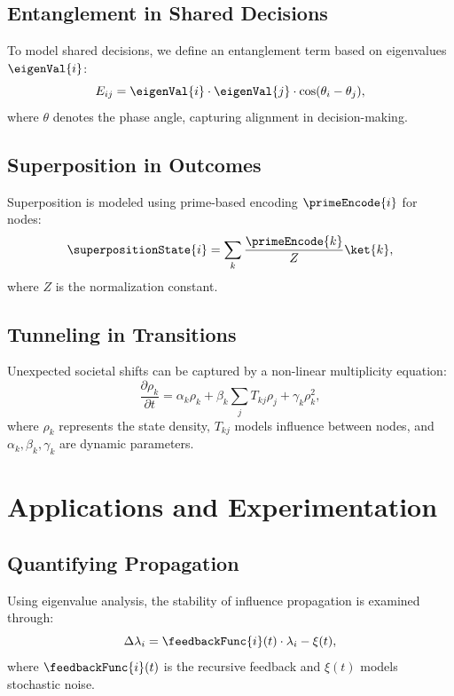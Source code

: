 \documentclass{article}
\theoremstyle{plain}
\begin{document}
\subsection{Entanglement in Shared Decisions}
To model shared decisions, we define an entanglement term based on eigenvalues \( \eigenVal{i} \):
\begin{equation}
    E_{ij} = \eigenVal{i} \cdot \eigenVal{j} \cdot \cos(\theta_i - \theta_j),
\end{equation}
where \( \theta \) denotes the phase angle, capturing alignment in decision-making.

\subsection{Superposition in Outcomes}
Superposition is modeled using prime-based encoding \( \primeEncode{i} \) for nodes:
\begin{equation}
    \superpositionState{i} = \sum_{k} \frac{\primeEncode{k}}{Z} \ket{k},
\end{equation}
where \( Z \) is the normalization constant.

\subsection{Tunneling in Transitions}
Unexpected societal shifts can be captured by a non-linear multiplicity equation:
\begin{equation}
    \frac{\partial \rho_k}{\partial t} = \alpha_k \rho_k + \beta_k \sum_{j} T_{kj} \rho_j + \gamma_k \rho_k^2,
\end{equation}
where \( \rho_k \) represents the state density, \( T_{kj} \) models influence between nodes, and \( \alpha_k, \beta_k, \gamma_k \) are dynamic parameters.

\section{Applications and Experimentation}

\subsection{Quantifying Propagation}
Using eigenvalue analysis, the stability of influence propagation is examined through:
\begin{equation}
    \Delta \lambda_i = \feedbackFunc{i}(t) \cdot \lambda_i - \xi(t),
\end{equation}
where \( \feedbackFunc{i}(t) \) is the recursive feedback and \( \xi(t) \) models stochastic noise.
\end{document}
